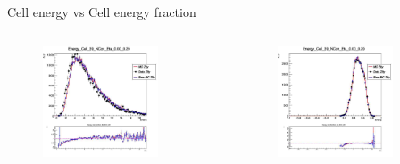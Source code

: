 \begin{frame}{Cell energy vs Cell energy fraction}
\begin{columns}

\begin{figure}
    \centering
    \includegraphics[width=0.8\textwidth]{BackUp/Part6/Img/RewEnergy_Cell_39_NCon_Eta_0.00_0.20Zlly.jpg}
\end{figure}

\begin{figure}
    \centering
    \includegraphics[width=0.8\textwidth]{BackUp/Part6/Img/RewEnergyFrac_Cell_39_NCon_Eta_0.00_0.20Zlly.jpg}
\end{figure}

\end{columns}    
\end{frame}
